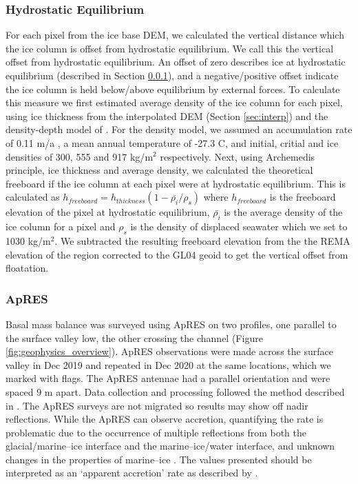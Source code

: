 \subsubsection{Hydrostatic Equilibrium} \label{sec:float}

For each pixel from the ice base DEM, we calculated the vertical distance which the ice column is offset from hydrostatic equilibrium. We call this the vertical offset from hydrostatic equilibrium.
An offset of zero describes ice at hydrostatic equilibrium (described in Section \ref{sec:float}), and a negative/positive offset indicate the ice column is held below/above equilibrium by external forces.
To calculate this measure we first estimated average density of the ice column for each pixel, using ice thickness from the interpolated DEM (Section \ref{sec:interp}) and the density-depth model of \cite{herron1980firn}. For the density model, we assumed an accumulation rate of 0.11 m/a \citep{craig_personal_comm}, a mean annual temperature of -27.3 \textdegree C, and initial, critial and ice densities of 300, 555 and 917 kg/$\mathrm{m}^2$ respectively.
Next, using Archemedis principle, ice thickness and average density, we calculated the theoretical freeboard if the ice column at each pixel were at hydrostatic equilibrium. This is calculated as $h_{freeboard} = h_{thickness} \left( 1 - \bar{\rho_i}/\rho_s \right)$ where $h_{freeboard}$ is the freeboard elevation of the pixel at hydrostatic equilibrium, $\bar{\rho_i}$ is the average density of the ice column for a pixel and $\rho_s$ is the density of displaced seawater which we set to 1030 kg/$\mathrm{m}^2$. We subtracted the resulting freeboard elevation from the the REMA elevation of the region corrected to the GL04 geoid to get the vertical offset from floatation.  

\subsubsection{ApRES} \label{sec:apres}

Basal mass balance was surveyed using ApRES on two profiles, one parallel to the surface valley low, the other crossing the channel (Figure \ref{fig:geophysics_overview}). ApRES observations were made across the surface valley in Dec 2019 and repeated in Dec 2020 at the same locations, which we marked with flags. The ApRES antennae had a parallel orientation and were spaced 9 m apart. Data collection and processing followed the method described in \cite{stewart2019basal}. The ApRES surveys are not migrated so results may show off nadir reflections.
While the ApRES can observe accretion, quantifying the rate is problematic due to the occurrence of multiple reflections from both the glacial/marine--ice interface and the marine--ice/water interface, and unknown changes in the properties of marine--ice  \citep{vavnkova2021nature}. The values presented should be interpreted as an `apparent accretion' rate as described by \cite{vavnkova2021nature}.

